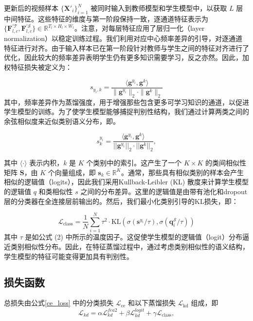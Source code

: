 \documentclass[10.5pt,letterpaper]{article}
\begin{document}
更新后的视频样本 \(\{ \textbf{X}'_i \}_{i=1}^N\) 被同时输入到教师模型和学生模型中，以获取 \(L\) 层中间特征。这些特征的维度与第一阶段保持一致，逐通道特征表示为 \(\{ \textbf{F}^{\prime\mathcal{T}}_{l,c}, \textbf{F}^{\prime\mathcal{S}}_{l,c} \} \in \mathbb{R}^{T_l \times H_l \times W_l}\)。注意，对每层特征应用了层归一化（layer normalization）以稳定训练过程。我们利用对应中心频率差异的引导，对逐通道特征进行对齐。由于输入样本已在第一阶段针对教师与学生之间的特征对齐进行了优化，因此较大的频率差异表明学生仍有更多知识需要学习，反之亦然。因此，加权特征损失被定义为：

\begin{equation}
s_{y_i,k} = \frac{\langle \textbf{g}^{y_i}, \textbf{g}^k \rangle}{\|\textbf{g}^{y_i}\|_2 \cdot \|\textbf{g}^k\|_2}
\label{eq:feat}
\end{equation}
其中，频率差异作为蒸馏强度，用于增强那些包含更多可学习知识的通道，以促进学生模型的训练。为了使学生模型能够捕捉判别性结构，我们通过计算两类之间的余弦相似度来近似类别语义分布，即。



\begin{equation}
s^{y_i}_{k} = \frac{\langle \textbf{g}^{y_i}, \textbf{g}^k \rangle}{||\textbf{g}^{y_i}||_2 \cdot ||\textbf{g}^k||_2},
\label{eq:sim}
\end{equation}

其中 \(\langle\cdot\rangle\) 表示内积，\(k\) 是 \(K\) 个类别中的索引。这产生了一个 \(K \times K\) 的类间相似性矩阵 \(\textbf{S}\)，由 \(K\) 个向量组成，即 \(\textbf{s}_k \in \mathbb{R}^K\)。通常，那些具有相似类别的样本会产生相似的逻辑值（logits），因此我们采用Kullback-Leibler (KL) 散度来计算学生模型的逻辑值 \(q\) 和类相似性 \(s\) 之间的分布差异。这里的逻辑值是由带有池化和dropout层的分类器在全连接层前输出的。然后，我们最小化类别引导的KL损失，即：

\begin{equation}
\mathcal{L}_{\text{class}} = \frac{1}{N} \sum_{i=1}^{N} \tau^2 \cdot \mathrm{KL}\left( \sigma(\textbf{s}^{y_i} / \tau), \sigma(\textbf{q}_i^{\mathcal{S}} / \tau) \right)
\label{eq:aux}
\end{equation}
其中 \(\tau\) 是如公式 (2) 中所示的温度因子。这促使学生模型的逻辑值（logit）分布逼近类别相似性分布。因此，在特征蒸馏过程中，通过考虑类别相似性的语义结构，学生模型的特征可能变得更加具有判别性。

\subsection{损失函数}
总损失由公式\ref{ce_loss} 中的分类损失 \(\mathcal{L}_{\text{ce}}\) 和以下蒸馏损失 \(\mathcal{L}_{\text{kd}}\) 组成，即
\begin{equation}
\mathcal{L}_{kd} = \alpha \mathcal{L}_{kd}^{fea2} + \beta \mathcal{L}_{kd}^{logit} + \gamma \mathcal{L}_{\text{class}},
\label{eq:total_loss}
\end{equation}
\end{document}
